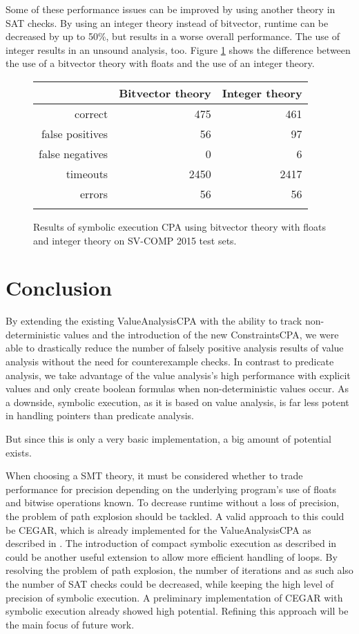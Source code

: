 Some of these performance issues can be improved by using another theory in SAT checks.
By using an integer theory instead of bitvector, runtime can be decreased by up to 50\%, but results in a worse overall performance.
The use of integer results in an unsound analysis, too. Figure \ref{bitvecIntComp} shows the difference between the use of a bitvector theory with floats and the use of an integer theory.
\begin{figure}
\begin{tabular}{| r || r | r |}
\hline
& Bitvector theory & Integer theory \\ \hline
correct         &  475 &  461 \\ \hline
false positives &   56 &   97 \\ \hline
false negatives &    0 &    6 \\ \hline
timeouts        & 2450 & 2417 \\ \hline
errors          &   56 &   56 \\ \hline
                & & \\ \hline
\end{tabular}
\caption{Results of symbolic execution CPA using bitvector theory with floats and integer theory on SV-COMP 2015 test sets.}
\label{bitvecIntComp}
\end{figure}

\section{Conclusion}
By extending the existing ValueAnalysisCPA with the ability to track non-deterministic values and the introduction of the new ConstraintsCPA,
we were able to drastically reduce the number of falsely positive analysis results of value analysis without the need for counterexample checks.
In contrast to predicate analysis, we take advantage of the value analysis's high performance with explicit values and only create boolean formulas when non-deterministic values occur.
As a downside, symbolic execution, as it is based on value analysis, is far less potent in handling pointers than predicate analysis.

But since this is only a very basic implementation, a big amount of potential exists.

When choosing a SMT theory,
it must be considered whether to trade performance for precision depending on the underlying program's use of floats and bitwise operations known.
To decrease runtime without a loss of precision, the problem of path explosion should be tackled.
A valid approach to this could be CEGAR, which is already implemented for the ValueAnalysisCPA as described in \cite{Beyer2013}.
The introduction of compact symbolic execution as described in \cite{Slaby2013} could be another useful extension to allow more efficient handling of loops.
By resolving the problem of path explosion, the number of iterations and as such also the number of SAT checks could be decreased, while keeping the high level of precision of symbolic execution.
A preliminary implementation of CEGAR with symbolic execution already showed high potential.
Refining this approach will be the main focus of future work.

